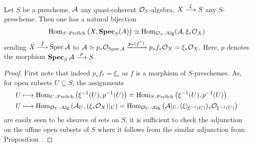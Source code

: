 \documentclass[a4paper,parskip=half,numbers=enddot, DIV=12]{scrreprt}
\begin{document}
\begin{prop}
    Let $S$ be a prescheme, $\mathcal{A}$ any quasi-coherent $\mathcal{O}_S$-algebra, $X\morphism[\xi] S$ any $S$-prescheme. Then one has a natural bijection
    \begin{align}\lbl{eq:SPECAdjunction}
        \Hom_{S\cat{-PreSch}} \big(X, \SPEC_S(A)\big) \simeq \Hom_{\Oo_S\cat{-Alg}} (\Aa, \xi_* \Oo_X)
    \end{align}
    sending $X\morphism[f] \Spec \Aa$ to $\mathcal{A} \simeq p_* \mathcal{O}_{\operatorname{Spec} \mathcal{A}} \xrightarrow{p_*(f^*)} p_*f_* \mathcal{O}_X = \xi_* \mathcal{O}_X$. Here, $p$ denotes the morphism $\SPEC_S \Aa \morphism[p] S$.
\end{prop}
\begin{proof}
    First note that indeed $p_*f_*=\xi_*$ as $f$ is a morphism of $S$-preschemes. As, for open subsets $U\subseteq S$, the assignments
    \begin{align*}
        U&\longmapsto \operatorname{Hom}_{U\operatorname{-PreSch}} \left(\xi^{-1}(U), p^{-1}(U)\right) = \operatorname{Hom}_{S\operatorname{-PreSch}}\left(\xi^{-1}(U), p^{-1}(U)\right)\\
        U&\longmapsto \operatorname{Hom}_{\mathcal{O}_U\operatorname{-Alg}} \left(\mathcal{A}_U, (\xi_*\mathcal{O}_X)|_U\right) = \operatorname{Hom}_{\mathcal{O}_U\operatorname{-Alg}}\left(\mathcal{A}|_U, (\xi|_{\xi^{-1}(U)})_* \mathcal{O}_{\xi^{-1}(U)}\right)
    \end{align*}
    are easily seen to be sheaves of sets on $S$, it is sufficient to check the adjunction on the affine open subsets of $S$ where it follows from the similar adjunction from Proposition~.
\end{proof}
\end{document}
